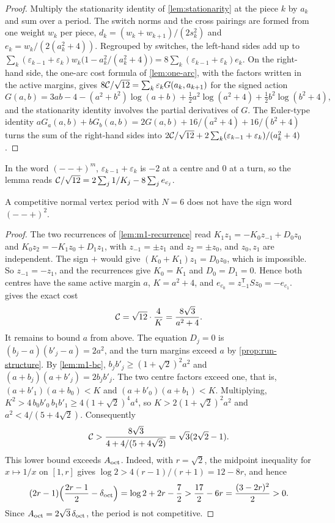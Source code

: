 \begin{proof}
  Multiply the stationarity identity of \cref{lem:stationarity} at the piece $k$ by $a_k$ and sum
  over a period. The switch norms and the cross pairings are formed from one weight $w_k$ per piece,
  $d_k=(w_k+w_{k+1})/(2s_k^2)$ and $e_k=w_k/(2(a_k^2+4))$. Regrouped by switches, the left-hand
  sides add up to $\sum_k(\varepsilon_{k-1}+\varepsilon_k)w_k\bigl(1-a_k^2/(a_k^2+4)\bigr)
  =8\sum_k(\varepsilon_{k-1}+\varepsilon_k)e_k$. On the right-hand side, the one-arc cost formula
  of \cref{lem:one-arc}, with the factors written in the active margins, gives
  $8\mathcal{C}/\sqrt{12}=\sum_k\varepsilon_kG(a_k,a_{k+1})$ for the signed action
  \[
    G(a,b)=3ab-4-(a^2+b^2)\log(a+b)+\tfrac12a^2\log(a^2+4)+\tfrac12b^2\log(b^2+4),
  \]
  and the stationarity identity involves the partial derivatives of $G$. The Euler-type identity
  $aG_a(a,b)+bG_b(a,b)=2G(a,b)+16/(a^2+4)+16/(b^2+4)$ turns the sum of the right-hand sides into
  $2\mathcal{C}/\sqrt{12}+2\sum_k(\varepsilon_{k-1}+\varepsilon_k)/(a_k^2+4)$.
\end{proof}

In the word $(--+)^m$, $\varepsilon_{k-1}+\varepsilon_k$ is $-2$ at a centre and $0$ at a turn,
so the lemma reads $\mathcal{C}/\sqrt{12}=2\sum_j1/K_j-8\sum_je_{c_j}$.

\begin{proposition}\label{prop:m1-two-centre}
  A competitive normal vertex period with $N=6$ does not have the sign word $(--+)^2$.
\end{proposition}

\begin{proof}
  The two recurrences of \cref{lem:m1-recurrence} read $K_1z_1=-K_0z_{-1}+D_0z_0$ and
  $K_0z_2=-K_1z_0+D_1z_1$, with $z_{-1}=\pm z_1$ and $z_2=\pm z_0$, and $z_0,z_1$ are independent.
  The sign $+$ would give $(K_0+K_1)z_1=D_0z_0$, which is impossible. So $z_{-1}=-z_1$, and the
  recurrences give $K_0=K_1$ and $D_0=D_1=0$. Hence both centres have the same active margin $a$,
  $K=a^2+4$, and $e_{c_0}=z_{-1}^{\mathsf T}Sz_0=-e_{c_1}$.  gives the exact
  cost
  \[
    \mathcal{C}=\sqrt{12}\cdot\frac 4K=\frac{8\sqrt3}{a^2+4}.
  \]
  It remains to bound $a$ from above. The equation $D_j=0$ is $(b_j-a)(b'_j-a)=2a^2$, and the
  turn margins exceed $a$ by \cref{prop:run-structure}. By \cref{lem:m1-bc},
  $b_jb'_j\ge(1+\sqrt2)^2a^2$ and $(a+b_j)(a+b'_j)=2b_jb'_j$. The two centre factors exceed one,
  that is, $(a+b'_1)(a+b_0)<K$ and $(a+b'_0)(a+b_1)<K$. Multiplying,
  $K^2>4\,b_0b'_0\,b_1b'_1\ge4(1+\sqrt2)^4a^4$, so
  $K>2(1+\sqrt2)^2a^2$ and $a^2<4/(5+4\sqrt2)$. Consequently
  \[
    \mathcal{C}>\frac{8\sqrt3}{4+4/(5+4\sqrt2)}=\sqrt3(2\sqrt2-1).
  \]
  This lower bound exceeds $A_{\mathrm{oct}}$. Indeed, with $r=\sqrt2$, the midpoint inequality for
  $x\mapsto1/x$ on $[1,r]$ gives $\log2>4(r-1)/(r+1)=12-8r$, and hence
  \[
   (2r-1)\Bigl(\frac{2r-1}{2}-\delta_{\mathrm{oct}}\Bigr)
   =\log2+2r-\frac72>\frac{17}{2}-6r=\frac{(3-2r)^2}{2}>0.
  \]
  Since $A_{\mathrm{oct}}=2\sqrt3\,\delta_{\mathrm{oct}}$, the period is not competitive.
\end{proof}

